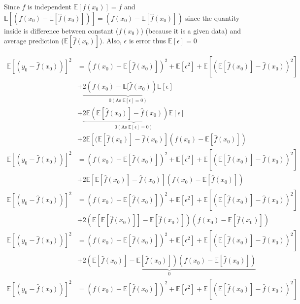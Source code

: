 \documentclass{article}[a4paper]
\begin{document}
Since $f$ is independent $\mathbb{E}[f(x_0)] = f$ and $\mathbb{E}[(f(x_0) - \mathbb{E}[\hat{f}(x_0)])] = (f(x_0) - \mathbb{E}[\hat{f}(x_0)])$ since the quantity inside is difference between constant ($f(x_0)$) (because it is a given data) and average prediction ($\mathbb{E}[\hat{f}(x_0)]$). Also, $\epsilon$ is error thus $\mathbb{E}[\epsilon] = 0$

\begin{align*}
    \mathbb{E}\left[(y_0 - \hat{f}(x_0))\right]^2 &= (f(x_0)-\mathbb{E}[\hat{f}(x_0)] )^2 + \mathbb{E}[\epsilon^2]  + \mathbb{E}[(\mathbb{E}[\hat{f}(x_0)] - \hat{f}(x_0))^2]\\
                      &+ \underbrace{2(f(x_0)-\mathbb{E}[\hat{f}(x_0))\mathbb{E}[\epsilon]}_{0 (\text{As }\mathbb{E}[\epsilon]=0)} \\
                      &+ \underbrace{2\mathbb{E}(\mathbb{E}[\hat{f}(x_0)] - \hat{f}(x_0))\mathbb{E}[\epsilon]}_{0 (\text{As }\mathbb{E}[\epsilon]=0)} \\
                      &+ 2\mathbb{E}[(\mathbb{E}[\hat{f}(x_0)] - \hat{f}(x_0)](f(x_0)-\mathbb{E}[\hat{f}(x_0)]) \\
    \mathbb{E}\left[(y_0 - \hat{f}(x_0))\right]^2 &= (f(x_0)-\mathbb{E}[\hat{f}(x_0)] )^2 + \mathbb{E}[\epsilon^2]  + \mathbb{E}[(\mathbb{E}[\hat{f}(x_0)] - \hat{f}(x_0))^2]\\
                      &+ 2\mathbb{E}[\mathbb{E}[\hat{f}(x_0)] - \hat{f}(x_0)](f(x_0)-\mathbb{E}[\hat{f}(x_0)])\\
    \mathbb{E}\left[(y_0 - \hat{f}(x_0))\right]^2 &= (f(x_0)-\mathbb{E}[\hat{f}(x_0)] )^2 + \mathbb{E}[\epsilon^2]  + \mathbb{E}[(\mathbb{E}[\hat{f}(x_0)] - \hat{f}(x_0))^2]\\
                      &+ 2\left(\mathbb{E}[\mathbb{E}[\hat{f}(x_0)]] - \mathbb{E}[\hat{f}(x_0)]\right)(f(x_0)-\mathbb{E}[\hat{f}(x_0)])\\
    \mathbb{E}\left[(y_0 - \hat{f}(x_0))\right]^2 &= (f(x_0)-\mathbb{E}[\hat{f}(x_0)] )^2 + \mathbb{E}[\epsilon^2]  + \mathbb{E}[(\mathbb{E}[\hat{f}(x_0)] - \hat{f}(x_0))^2]\\
                      &+ \underbrace{2(\mathbb{E}[\hat{f}(x_0)] - \mathbb{E}[\hat{f}(x_0)])(f(x_0)-\mathbb{E}[\hat{f}(x_0)])}_{0}\\
    \mathbb{E}\left[(y_0 - \hat{f}(x_0))\right]^2 &= (f(x_0)-\mathbb{E}[\hat{f}(x_0)] )^2 + \mathbb{E}[\epsilon^2]  + \mathbb{E}[(\mathbb{E}[\hat{f}(x_0)] - \hat{f}(x_0))^2]\\
\end{align*}
\end{document}
